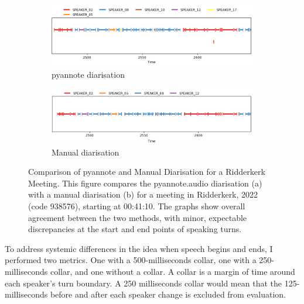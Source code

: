 \documentclass[twoside]{uva-inf-bachelor-thesis}
\begin{document}
\begin{figure}[htbp]
    \centering
    \begin{subfigure}{0.9\textwidth}
        \centering
        \includegraphics[width=\linewidth]{images/refDiar.png}
        \caption{pyannote diarisation}
        \label{fig:subfiga}
    \end{subfigure}
    \hfill
    \begin{subfigure}{0.9\textwidth}
        \centering
        \includegraphics[width=\linewidth]{images/hypDiar.png}
        \caption{Manual diarisation}
        \label{fig:subfigb}
    \end{subfigure}
    \caption{Comparison of pyannote and Manual Diarisation for a Ridderkerk Meeting. This figure compares the pyannote.audio diarisation (a) with a manual diarisation (b) for a meeting in Ridderkerk, 2022 (code 938576), starting at 00:41:10. The graphs show overall agreement between the two methods, with minor, expectable discrepancies at the start and end points of speaking turns.}
    \label{fig:manvspyan}
\end{figure}

To address systemic differences in the idea when speech begins and ends, I performed two metrics. One with a 500-milliseconds collar, one with a 250-milliseconds collar, and one without a collar. 
A collar is a margin of time around each speaker's turn boundary. A 250 milliseconds collar would mean that the 125-milliseconds before and after each speaker change is excluded from evaluation.
\end{document}
